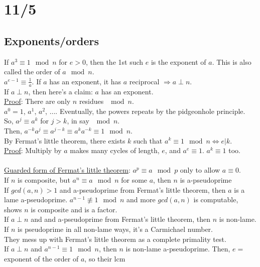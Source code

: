 \documentclass[13pt]{article}
\begin{document}
\section*{11/5}
	\subsection*{Exponents/orders}
		If $a^3 \equiv 1 \mod n$ for $e > 0$, then the 1st such $e$ is the 
		exponent of $a$. This is also called the order of $a \mod n$.\\
		$a^{e - 1} \equiv \frac{1}{a}$. If $a$ has an exponent, it has
		$a$ reciprocal $\Rightarrow a \perp n$.\\
		If $a \perp n$, then here's a claim: $a$ has an exponent.\\
		\underline{Proof}: There are only $n$ residues $\mod n$.\\
		$a^0 = 1$, $a^1$, $a^2$, $\ldots$. Eventually, the powers repeats
		by the pidgeonhole principle.\\
		So, $a^j \equiv a^k$ for $j > k$, in say $\mod n$.\\
		Then, $a^{-k}a^j \equiv a^{j-k} \equiv a^ka^{-k} \equiv 1 \mod n$.\\
		By Fermat's little theorem, there exists $k$ such that
		$a^k \equiv 1 \mod n \Leftrightarrow e | k$.\\
		\underline{Proof}: Multiply by $a$ makes many cycles of length, $e$,
		and $a^e \equiv 1$. $a^k \equiv 1$ too.\\\\
	\underline{Guarded form of Fermat's little theorem}: $a^p \equiv a \mod 
	p$ only to allow $a \equiv 0$.\\
	If $n$ is composite, but $a^n \equiv a \mod n$ for some $a$, then
	$n$ is a-pseudoprime\\
	If $gcd(a,n) > 1$ and a-pseudoprime from Fermat's little theorem, then
	$a$ is a lame a-pseudoprime. $a^{n-1} \not\equiv 1 \mod n$ and
	more $gcd(a,n)$ is computable, shows $n$ is composite and is a factor.\\
	If $a \perp n$ and and a-pseudoprime from Fermat's little theorem, then
	$n$ is non-lame.\\
	If $n$ is pseudoprime in all non-lame ways, it's a Carmichael number.\\
	They mess up with Fermat's little theorem as a complete primality test.\\
	If $a \perp n$ and $a^{n-1} \equiv 1 \mod n$, then $n$ is non-lame 
	a-pseudoprime. Then, $e = $ exponent of the order of $a$, so their lcm 
\end{document}
